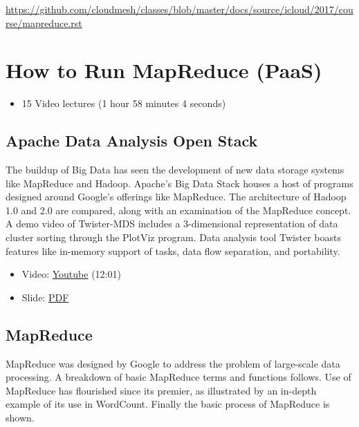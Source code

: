 \begin{fileremark}\url{https://github.com/cloudmesh/classes/blob/master/docs/source/icloud/2017/course/mapreduce.rst}\end{fileremark}

\section{How to Run MapReduce (PaaS)}\label{how-to-run-mapreduce-paas}

\begin{itemize}
\tightlist
\item
  15 Video lectures (1 hour 58 minutes 4 seconds)
\end{itemize}

\subsection{Apache Data Analysis Open
Stack}\label{apache-data-analysis-open-stack}

The buildup of Big Data has seen the development of new data storage
systems like MapReduce and Hadoop. Apache's Big Data Stack houses a host
of programs designed around Google's offerings like MapReduce. The
architecture of Hadoop 1.0 and 2.0 are compared, along with an
examination of the MapReduce concept. A demo video of Twister-MDS
includes a 3-dimensional representation of data cluster sorting through
the PlotViz program. Data analysis tool Twister boasts features like
in-memory support of tasks, data flow separation, and portability.

\begin{itemize}
\tightlist
\item
  Video: \href{https://www.youtube.com/watch?v=6vkgvGtyv4Q}{Youtube}
  (12:01)
\end{itemize}

\begin{itemize}
\tightlist
\item
  Slide:
  \href{https://drive.google.com/open?id=0B88HKpainTSfMnpCelpNQUpNdVE}{PDF}
\end{itemize}

\subsection{MapReduce}\label{mapreduce}

MapReduce was designed by Google to address the problem of large-scale
data processing. A breakdown of basic MapReduce terms and functions
follows. Use of MapReduce has flourished since its premier, as
illustrated by an in-depth example of its use in WordCount. Finally the
basic process of MapReduce is shown.


